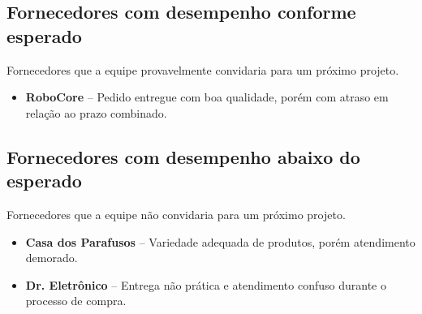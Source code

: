 \subsection{Fornecedores com desempenho conforme esperado}

Fornecedores que a equipe provavelmente convidaria para um próximo projeto.

\begin{itemize}
    \item \textbf{RoboCore} -- Pedido entregue com boa qualidade, porém com atraso em relação ao prazo combinado.
\end{itemize}

\subsection{Fornecedores com desempenho abaixo do esperado}

Fornecedores que a equipe não convidaria para um próximo projeto.

\begin{itemize}
    \item \textbf{Casa dos Parafusos} -- Variedade adequada de produtos, porém atendimento demorado.
    \item \textbf{Dr. Eletrônico} -- Entrega não prática e atendimento confuso durante o processo de compra.
\end{itemize}








